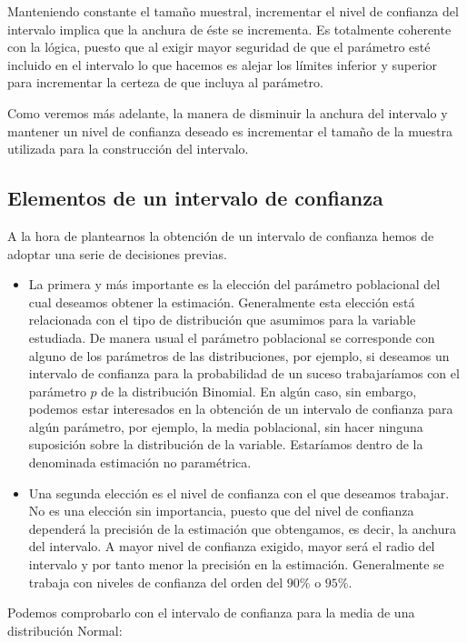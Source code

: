 \documentclass[
]{article}
\providecommand{\tightlist}{%
  \setlength{\itemsep}{0pt}\setlength{\parskip}{0pt}}
\begin{document}
Manteniendo constante el tamaño muestral, incrementar el nivel de confianza del intervalo implica que la anchura de éste se incrementa. Es totalmente coherente con la lógica, puesto que al exigir mayor seguridad de que el parámetro esté incluido en el intervalo lo que hacemos es alejar los límites inferior y superior para incrementar la certeza de que incluya al parámetro.

Como veremos más adelante, la manera de disminuir la anchura del intervalo y mantener un nivel de confianza deseado es incrementar el tamaño de la muestra utilizada para la construcción del intervalo.

\subsection{Elementos de un intervalo de confianza}\label{elementos-de-un-intervalo-de-confianza}

A la hora de plantearnos la obtención de un intervalo de confianza hemos de adoptar una serie de decisiones previas.

\begin{itemize}
\tightlist
\item
  La primera y más importante es la elección del parámetro poblacional del cual deseamos obtener la estimación. Generalmente esta elección está relacionada con el tipo de distribución que asumimos para la variable estudiada. De manera usual el parámetro poblacional se corresponde con alguno de los parámetros de las distribuciones, por ejemplo, si deseamos un intervalo de confianza para la probabilidad de un suceso trabajaríamos con el parámetro \(p\) de la distribución Binomial. En algún caso, sin embargo, podemos estar interesados en la obtención de un intervalo de confianza para algún parámetro, por ejemplo, la media poblacional, sin hacer ninguna suposición sobre la distribución de la variable. Estaríamos dentro de la denominada estimación no paramétrica.
\item
  Una segunda elección es el nivel de confianza con el que deseamos trabajar. No es una elección sin importancia, puesto que del nivel de confianza dependerá la precisión de la estimación que obtengamos, es decir, la anchura del intervalo. A mayor nivel de confianza exigido, mayor será el radio del intervalo y por tanto menor la precisión en la estimación. Generalmente se trabaja con niveles de confianza del orden del \(90 \%\) o \(95 \%\).
\end{itemize}

Podemos comprobarlo con el intervalo de confianza para la media de una distribución Normal:
\end{document}
